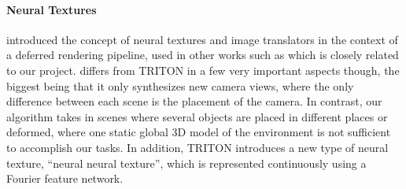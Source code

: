 \documentclass{article}
\begin{document}
\vspace{-8pt}
\paragraph{Neural Textures}
\citet{deferred_neural_rendering} introduced the concept of neural textures and image translators in the context of a deferred rendering pipeline, used in other works such as \cite{surgical_video_translation} which is closely related to our project. 
\citet{surgical_video_translation} differs from TRITON in a few very important aspects though, the biggest being that it only synthesizes new camera views, where the only difference between each scene is the placement of the camera. In contrast, our algorithm takes in scenes where several objects are placed in different places or deformed, where one static global 3D model of the environment is not sufficient to accomplish our tasks. In addition, TRITON introduces a new type of neural texture, ``neural neural texture'', which is represented continuously using a Fourier feature network. 













\end{document}
